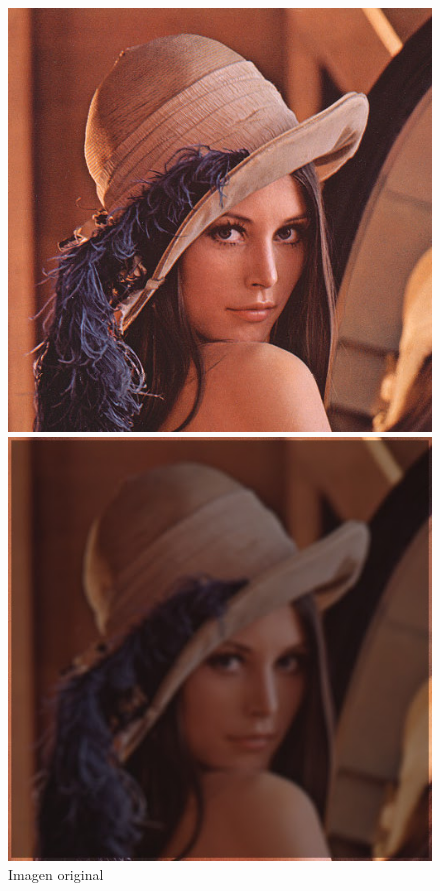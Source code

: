 \begin{figure}[H]
	\centering
	\begin{minipage}{.3\textwidth}
		\centering
		\includegraphics[width=\linewidth]{blur_original.jpg}
		\caption{Imagen original}
		\label{fig:blur_original}
	\end{minipage}\hfill
	\begin{minipage}{.3\textwidth}
		\centering
		\includegraphics[width=\linewidth]{blur_s1_r1.jpg}

\end{minipage}
\end{figure}
